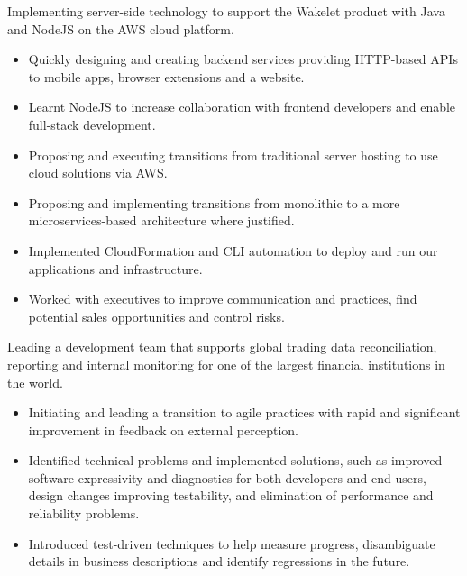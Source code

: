 \documentclass[11pt,a4paper,sans]{moderncv}        %
\begin{document}
{Implementing server-side technology to support the Wakelet product with Java and NodeJS on the AWS cloud platform.
\newline{}
\begin{itemize}
\item Quickly designing and creating backend services providing HTTP-based APIs to mobile apps, browser extensions and a website.
\item Learnt NodeJS to increase collaboration with frontend developers and enable full-stack development.
\item Proposing and executing transitions from traditional server hosting to use cloud solutions via AWS.
\item Proposing and implementing transitions from monolithic to a more microservices-based architecture where justified.
\item Implemented CloudFormation and CLI automation to deploy and run our applications and infrastructure.
\item Worked with executives to improve communication and practices, find potential sales opportunities and control risks.
\end{itemize}
}

{Leading a development team that supports global trading data reconciliation, reporting and internal monitoring for one of the largest financial institutions in the world.
\newline{}
\begin{itemize}
\item Initiating and leading a transition to agile practices with rapid and significant improvement in feedback on external perception.
\item Identified technical problems and implemented solutions, such as improved software expressivity and diagnostics for both developers and end users, design changes improving testability, and elimination of performance and reliability problems.
\item Introduced test-driven techniques to help measure progress, disambiguate details in business descriptions and identify regressions in the future.
\end{itemize}
}

\end{document}
